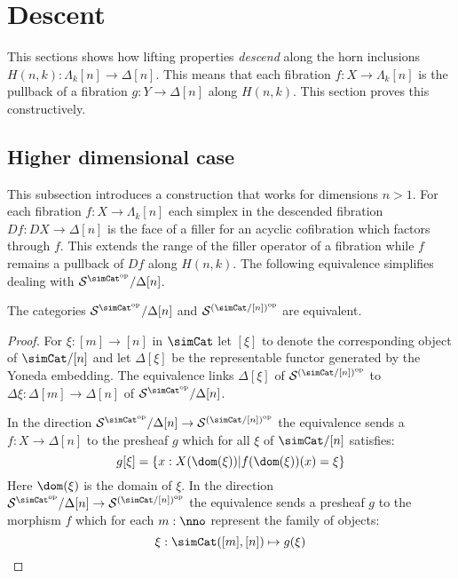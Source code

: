 \documentclass{tac}
\newcommand\cat\mathcal
\newcommand\set[1]{\left\{#1\right\}}
\newcommand\dual{^{\mathrm{op}}}
\newcommand\s{^{\simCat\dual}}
\newcommand\of{:}
\newcommand\simplex\Delta
\newcommand\horn\Lambda
\begin{document}
\section{Descent}
This sections shows how lifting properties \emph{descend} along the horn inclusions $H(n,k)\of \horn_k[n]\to\simplex[n]$. This means that each fibration $f\of X\to\horn_k[n]$ is the pullback of a fibration $g\of Y\to\simplex[n]$ along $H(n,k)$. This section proves this constructively.

\subsection{Higher dimensional case}
This subsection introduces a construction that works for dimensions $n>1$. For each fibration $f\of X\to \horn_k[n]$ each simplex in the descended fibration $Df\of DX\to \simplex[n]$ is the face of a filler for an acyclic cofibration which factors through $f$. This extends the range of the filler operator of a fibration while $f$ remains a pullback of $Df$ along $H(n,k)$. The following equivalence simplifies dealing with $\cat S\s/\simplex[n]$.

\begin{lemma} The categories $\cat S\s/\simplex[n]$ and $\cat S^{(\simCat/[n])\dual}$ are equivalent. \label{slice equivalence} \end{lemma}

\begin{proof} For $\xi\of[m]\to[n]$ in $\simCat$ let $[\xi]$ to denote the corresponding object of $\simCat/[n]$ and let $\simplex[\xi]$ be the representable functor generated by the Yoneda embedding. The equivalence links $\simplex[\xi]$ of $\cat S^{(\simCat/[n])\dual}$ to $\Delta\xi\of \simplex[m]\to \simplex[n]$ of $\cat S\s/\simplex[n]$.

In the direction $\cat S\s/\simplex[n]\to \cat S^{(\simCat/[n])\dual}$ the equivalence sends a $f\of X\to \simplex[n]$ to the presheaf $g$ which for all $\xi$ of $\simCat/[n]$ satisfies:
\[ g[\xi] = \set{ x\of X(\dom(\xi)) | f(\dom(\xi))(x)=\xi } \]
Here $\dom(\xi)$ is the domain of $\xi$.
In the direction $\cat S\s/\simplex[n]\to \cat S^{(\simCat/[n])\dual}$ the equivalence sends a presheaf $g$ to the morphism $f$ which for each $m\of\nno$ represent the family of objects:
\[ \xi\of\simCat([m],[n])\mapsto g(\xi) \]
\end{proof}

\end{document}
